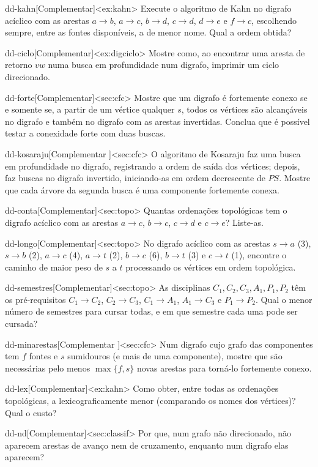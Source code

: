 \begin{exercicio}{dd-kahn}[Complementar]<ex:kahn>
Execute o algoritmo de Kahn no digrafo acíclico com as arestas $a\to b$, $a\to c$, $b\to d$, $c\to d$, $d\to e$ e $f\to c$, escolhendo sempre, entre as fontes disponíveis, a de menor nome. Qual a ordem obtida?
\end{exercicio}
\begin{exercicio}{dd-ciclo}[Complementar]<ex:digciclo>
Mostre como, ao encontrar uma aresta de retorno $vw$ numa busca em profundidade num digrafo, imprimir um ciclo direcionado.
\end{exercicio}
\begin{exercicio}{dd-forte}[Complementar]<sec:cfc>
Mostre que um digrafo é fortemente conexo se e somente se, a partir de um vértice qualquer $s$, todos os vértices são alcançáveis no digrafo e também no digrafo com as arestas invertidas. Conclua que é possível testar a conexidade forte com duas buscas.
\end{exercicio}
\begin{exercicio}{dd-kosaraju}[Complementar \estrela]<sec:cfc>
O algoritmo de Kosaraju faz uma busca em profundidade no digrafo, registrando a ordem de saída dos vértices; depois, faz buscas no digrafo invertido, iniciando-as em ordem decrescente de $PS$. Mostre que cada árvore da segunda busca é uma componente fortemente conexa.
\end{exercicio}
\begin{exercicio}{dd-conta}[Complementar]<sec:topo>
Quantas ordenações topológicas tem o digrafo acíclico com as arestas $a\to c$, $b\to c$, $c\to d$ e $c\to e$? Liste-as.
\end{exercicio}
\begin{exercicio}{dd-longo}[Complementar]<sec:topo>
No digrafo acíclico com as arestas $s\to a$ (3), $s\to b$ (2), $a\to c$ (4), $a\to t$ (2), $b\to c$ (6), $b\to t$ (3) e $c\to t$ (1), encontre o caminho de maior peso de $s$ a $t$ processando os vértices em ordem topológica.
\end{exercicio}
\begin{exercicio}{dd-semestres}[Complementar]<sec:topo>
As disciplinas $C_1,C_2,C_3,A_1,P_1,P_2$ têm os pré-requisitos $C_1\to C_2$, $C_2\to C_3$, $C_1\to A_1$, $A_1\to C_3$ e $P_1\to P_2$. Qual o menor número de semestres para cursar todas, e em que semestre cada uma pode ser cursada?
\end{exercicio}
\begin{exercicio}{dd-minarestas}[Complementar \estrela]<sec:cfc>
Num digrafo cujo grafo das componentes tem $f$ fontes e $s$ sumidouros (e mais de uma componente), mostre que são necessárias pelo menos $\max\{f,s\}$ novas arestas para torná-lo fortemente conexo.
\end{exercicio}
\begin{exercicio}{dd-lex}[Complementar]<ex:kahn>
Como obter, entre todas as ordenações topológicas, a lexicograficamente menor (comparando os nomes dos vértices)? Qual o custo?
\end{exercicio}
\begin{exercicio}{dd-nd}[Complementar]<sec:classif>
Por que, num grafo não direcionado, não aparecem arestas de avanço nem de cruzamento, enquanto num digrafo elas aparecem?
\end{exercicio}
